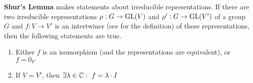 \textbf{Shur's Lemma} makes statements about irreducible representations.
If there are two irreducible representations $\rho: G \to \operatorname{GL}(V)$ and $\rho': G \to \operatorname{GL}(V')$ of a group $G$ and $f: V \to V'$ is an intertwiner (see  for the definition) of these representations, then the following statements are true.
\begin{enumerate}
    \item Either $f$ is an isomorphism (and the representations are equivalent), or $f = 0_{V'}$
    \item If $V = V'$, then $\exists \lambda \in \mathbb{C}:\ f = \lambda \cdot I$
\end{enumerate}



